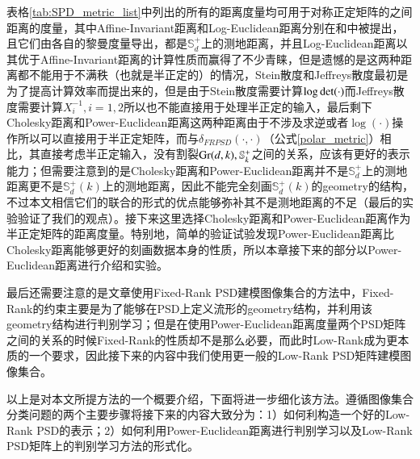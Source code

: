 表格\ref{tab:SPD_metric_list}中列出的所有的距离度量均可用于对称正定矩阵的之间距离的度量，其中Affine-Invariant距离和Log-Euclidean距离分别在\cite{AIM_metric}和\cite{LEM_metric}中被提出，且它们由各自的黎曼度量导出，都是$\mathbb{S}_{d}^{+}$上的测地距离，并且Log-Euclidean距离以其优于Affine-Invariant距离的计算性质而赢得了不少青睐，但是遗憾的是这两种距离都不能用于不满秩（也就是半正定的）的情况，Stein散度\cite{Stein_divergence}和Jeffreys散度\cite{Jeffreys_divergence}最初是为了提高计算效率而提出来的，但是由于Stein散度需要计算$\log {\rm det}(\cdot)$而Jeffreys散度需要计算$X_{i}^{-1},i=1,2$所以也不能直接用于处理半正定的输入，最后剩下Cholesky距离\cite{Cholesky_distance}和Power-Euclidean距离\cite{Cholesky_distance}这两种距离由于不涉及求逆或者$\log(\cdot)$操作所以可以直接用于半正定矩阵，而与$\delta_{FRPSD}(\cdot,\cdot)$（公式\ref{polar_metric}）相比，其直接考虑半正定输入，没有割裂${\rm Gr}(d,k),\mathbb{S}_{k}^{+}$之间的关系，应该有更好的表示能力；但需要注意到的是Cholesky距离和Power-Euclidean距离并不是$\mathbb{S}_{d}^{+}$上的测地距离更不是$\mathbb{S}_{d}^{+}(k)$上的测地距离，因此不能完全刻画$\mathbb{S}_{d}^{+}(k)$的geometry的结构，不过本文相信它们的联合的形式的优点能够弥补其不是测地距离的不足（最后的实验验证了我们的观点）。接下来这里选择Cholesky距离和Power-Euclidean距离作为半正定矩阵的距离度量。特别地，简单的验证试验发现Power-Euclidean距离比Cholesky距离能够更好的刻画数据本身的性质，所以本章接下来的部分以Power-Euclidean距离进行介绍和实验。

最后还需要注意的是文章\cite{PSD_WACV}使用Fixed-Rank PSD建模图像集合的方法中，Fixed-Rank的约束主要是为了能够在PSD上定义流形的geometry结构，并利用该geometry结构进行判别学习；但是在使用Power-Euclidean距离度量两个PSD矩阵之间的关系的时候Fixed-Rank的性质却不是那么必要，而此时Low-Rank成为更本质的一个要求，因此接下来的内容中我们使用更一般的Low-Rank PSD矩阵建模图像集合。

以上是对本文所提方法的一个概要介绍，下面将进一步细化该方法。遵循图像集合分类问题的两个主要步骤将接下来的内容大致分为：1）如何利构造一个好的Low-Rank PSD的表示；2）如何利用Power-Euclidean距离进行判别学习以及Low-Rank PSD矩阵上的判别学习方法的形式化。

